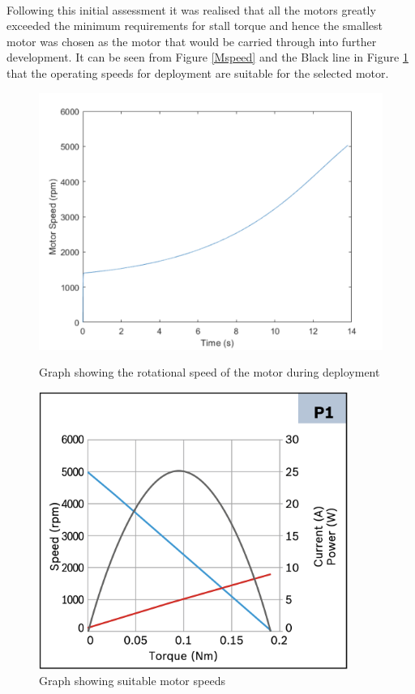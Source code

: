 \documentclass[a4paper]{article}
\begin{document}
\paragraph{}
Following this initial assessment it was realised that all the motors greatly exceeded the minimum requirements for stall torque and hence the smallest motor was chosen as the motor that would be carried through into further development. It can be seen from Figure \ref{Mspeed} and the Black line in Figure \ref{Mstat} that the operating speeds for deployment are suitable for the selected motor.

\begin{figure}[H]
 \centering
\begin{minipage}[b]{0.4\textwidth}
\includegraphics[width=1\textwidth]{MotorSpeed.png}
    \caption{\label{Mspeed} Graph showing the rotational speed of the motor during deployment}
\end{minipage}
\hfill
\begin{minipage}[b]{0.4\textwidth}
\includegraphics[width=0.9\textwidth]{Motorstat.png}
    \caption{\label{Mstat} Graph showing suitable motor speeds}
\end{minipage}
\end{figure}
\end{document}

